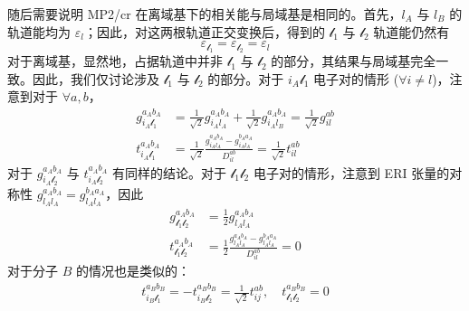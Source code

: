 随后需要说明 MP2/cr 在离域基下的相关能与局域基是相同的。首先，$l_A$ 与 $l_B$ 的轨道能均为 $\varepsilon_l$；因此，对这两根轨道正交变换后，得到的 $\mathscr{l}_1$ 与 $\mathscr{l}_2$ 轨道能仍然有
\begin{equation*}
  \varepsilon_{\mathscr{l}_1} = \varepsilon_{\mathscr{l}_2} = \varepsilon_l
\end{equation*}
对于离域基，显然地，占据轨道中并非 $\mathscr{l}_1$ 与 $\mathscr{l}_2$ 的部分，其结果与局域基完全一致。因此，我们仅讨论涉及 $\mathscr{l}_1$ 与 $\mathscr{l}_2$ 的部分。对于 ${i_A \mathscr{l}_1}$ 电子对的情形 ($\forall i \neq l$)，注意到对于 $\forall a, b$，
\begin{align*}
  g_{i_A \mathscr{l}_1}^{a_A b_A} &= \frac{1}{\sqrt{2}} g_{i_A l_A}^{a_A b_A} + \frac{1}{\sqrt{2}} g_{i_A l_B}^{a_A b_A} = \frac{1}{\sqrt{2}} g_{il}^{ab} \\
  t_{i_A \mathscr{l}_1}^{a_A b_A} &= \frac{1}{\sqrt{2}} \frac{g_{i_A l_A}^{a_A b_A} - g_{i_A l_A}^{b_A a_A}}{D_{il}^{ab}} = \frac{1}{\sqrt{2}} t_{il}^{ab}
\end{align*}
对于 $g_{i_A \mathscr{l}_2}^{a_A b_A}$ 与 $t_{i_A \mathscr{l}_2}^{a_A b_A}$ 有同样的结论。对于 $\mathscr{l}_1 \mathscr{l}_2$ 电子对的情形，注意到 ERI 张量的对称性 $g_{l_A l_A}^{a_A b_A} = g_{l_A l_A}^{b_A a_A}$，因此
\begin{align*}
  g_{\mathscr{l}_1 \mathscr{l}_2}^{a_A b_A} &= \frac{1}{2} g_{l_A l_A}^{a_A b_A} \\
  t_{\mathscr{l}_1 \mathscr{l}_2}^{a_A b_A} &= \frac{1}{2} \frac{g_{l_A l_A}^{a_A b_A} - g_{l_A l_A}^{b_A a_A}}{D_{il}^{ab}} = 0
\end{align*}
对于分子 $B$ 的情况也是类似的：
\begin{gather*}
  t_{i_B \mathscr{l}_1}^{a_B b_B} = - t_{i_B \mathscr{l}_2}^{a_B b_B} = \frac{1}{\sqrt{2}} t_{ij}^{ab} , \quad
  t_{\mathscr{l}_1 \mathscr{l}_2}^{a_B b_B} = 0
\end{gather*}

